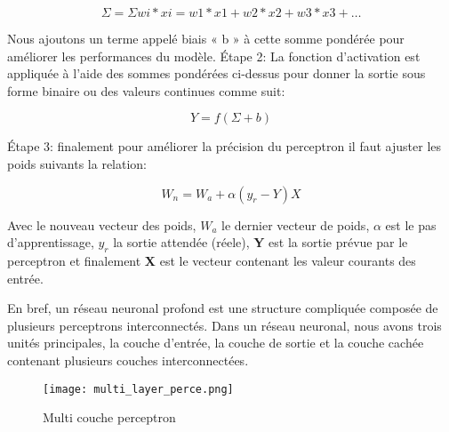             \begin{equation}\label{eq:per_sum}
                \Sigma = \Sigma wi*xi = w1*x1 + w2*x2 + w3*x3 + \dots
            \end{equation}


            Nous ajoutons un terme appelé biais « b » à cette somme pondérée pour améliorer les performances du modèle. 
            Étape 2: La fonction d'activation est appliquée à l'aide des sommes pondérées ci-dessus pour donner la sortie sous forme binaire ou des valeurs continues comme suit:


            \begin{equation}\label{eq:per_func}
                Y = f(\Sigma + b)
            \end{equation}

            Étape 3: finalement pour améliorer la précision du perceptron il faut ajuster les poids suivants la relation:

            \begin{equation}\label{eq:per_weights}
                W_n = W_a + \alpha (y_r - Y) X
            \end{equation}
            

            Avec  le nouveau vecteur des poids, \textbf{\(W_a\)} le dernier vecteur de poids, \textbf{\(\alpha\)} est le pas d'apprentissage, \textbf{\(y_r\)} la sortie attendée (réele), \textbf{Y} est la sortie prévue par le perceptron et finalement \textbf{X} est le vecteur contenant les valeur courants des entrée.

        En bref, un réseau neuronal profond est une structure compliquée composée de plusieurs perceptrons interconnectés. Dans un réseau neuronal, nous avons trois unités principales, la couche d'entrée, la couche de sortie et la couche cachée contenant plusieurs couches interconnectées.
        
        \begin{figure}[H] 
            \centering
            \texttt{[image: multi\_layer\_perce.png]}
            \caption{Multi couche perceptron}
            \label{fig:m_l_p}
        \end{figure}

